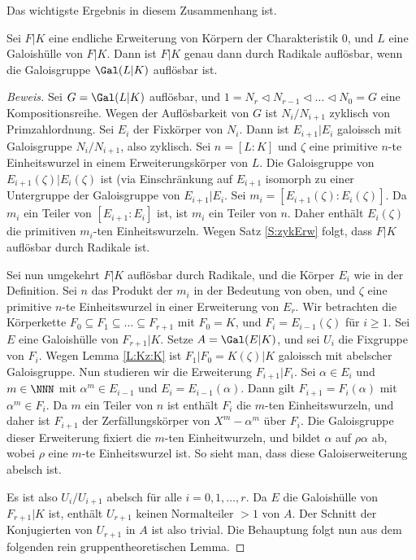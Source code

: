 \documentclass[12pt,a4paper,twoside]{article}
\begin{document}
Das wichtigste Ergebnis in diesem Zusammenhang ist.
\begin{Satz}
  Sei $F|K$ eine endliche Erweiterung von K\"orpern der Charakteristik $0$,
  und $L$ eine Galoish\"ulle von $F|K$. Dann ist $F|K$ genau dann durch
  Radikale aufl\"osbar, wenn die Galoisgruppe $\Gal(L|K)$ aufl\"osbar ist.
\end{Satz}
\begin{proof}[Beweis]
  Sei $G=\Gal(L|K)$ aufl\"osbar, und $1=N_r\triangleleft
  N_{r-1}\triangleleft\dots\triangleleft N_0=G$ eine Kompositionsreihe. Wegen
  der Aufl\"osbarkeit von $G$ ist $N_{i}/N_{i+1}$ zyklisch von
  Primzahlordnung. Sei $E_i$ der Fixk\"orper von $N_i$. Dann ist
  $E_{i+1}|E_{i}$ galoissch mit Galoisgruppe $N_{i}/N_{i+1}$, also zyklisch.
  Sei $n=[L:K]$ und $\zeta$ eine primitive $n$-te Einheitswurzel in einem
  Erweiterungsk\"orper von $L$. Die Galoisgruppe von
  $E_{i+1}(\zeta)|E_{i}(\zeta)$ ist (via Einschr\"ankung auf $E_{i+1}$
  isomorph zu einer Untergruppe der Galoisgruppe von $E_{i+1}|E_{i}$. Sei
  $m_i=[E_{i+1}(\zeta):E_{i}(\zeta)]$. Da $m_i$ ein Teiler von
  $[E_{i+1}:E_{i}]$ ist, ist $m_i$ ein Teiler von $n$. Daher enth\"alt
  $E_i(\zeta)$ die primitiven $m_i$-ten Einheitswurzeln. Wegen Satz
  \ref{S:zykErw} folgt, dass $F|K$ aufl\"osbar durch Radikale ist.
  
  Sei nun umgekehrt $F|K$ aufl\"osbar durch Radikale, und die K\"orper $E_i$
  wie in der Definition. Sei $n$ das Produkt der $m_i$ in der Bedeutung von
  oben, und $\zeta$ eine primitive $n$-te Einheitswurzel in einer Erweiterung
  von $E_r$. Wir betrachten die K\"orperkette $F_0\subseteq
  F_1\subseteq\dots\subseteq F_{r+1}$ mit $F_0=K$, und $F_i=E_{i-1}(\zeta)$
  f\"ur $i\ge1$. Sei $E$ eine Galoish\"ulle von $F_{r+1}|K$. Setze
  $A=\Gal(E|K)$, und sei $U_i$ die Fixgruppe von $F_i$. Wegen Lemma
  \ref{L:Kz:K} ist $F_1|F_0=K(\zeta)|K$ galoissch mit abelscher Galoisgruppe.
  Nun studieren wir die Erweiterung $F_{i+1}|F_i$. Sei $\alpha\in E_i$ und
  $m\in\NNN$ mit $\alpha^m\in E_{i-1}$ und $E_i=E_{i-1}(\alpha)$. Dann gilt
  $F_{i+1}=F_i(\alpha)$ mit $\alpha^m\in F_i$. Da $m$ ein Teiler von $n$ ist
  enth\"alt $F_i$ die $m$-ten Einheitswurzeln, und daher ist $F_{i+1}$ der
  Zerf\"allungsk\"orper von $X^m-\alpha^m$ \"uber $F_i$. Die Galoisgruppe
  dieser Erweiterung fixiert die $m$-ten Einheitwurzeln, und bildet $\alpha$
  auf $\rho\alpha$ ab, wobei $\rho$ eine $m$-te Einheitswurzel ist. So sieht
  man, dass diese Galoiserweiterung abelsch ist.

Es ist also $U_i/U_{i+1}$ abelsch f\"ur alle $i=0,1,\dots,r$. Da $E$ die
Galoish\"ulle von $F_{r+1}|K$ ist, enth\"alt $U_{r+1}$ keinen Normalteiler
$>1$ von $A$. Der Schnitt der Konjugierten von $U_{r+1}$ in $A$ ist also
trivial. Die Behauptung folgt nun aus dem folgenden rein gruppentheoretischen
Lemma.
\end{proof}
\end{document}
